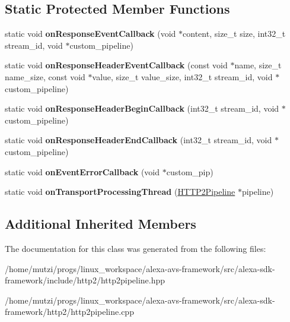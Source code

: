 \subsection*{Static Protected Member Functions}
\begin{DoxyCompactItemize}
\item 
\mbox{\label{classhttp2_1_1HTTP2Pipeline_abb2865cd0061831b365e250d414cb088}} 
static void {\bfseries on\+Response\+Event\+Callback} (void $\ast$content, size\+\_\+t size, int32\+\_\+t stream\+\_\+id, void $\ast$custom\+\_\+pipeline)
\item 
\mbox{\label{classhttp2_1_1HTTP2Pipeline_ac4048cb93d46d574e7e3c05435a49a5d}} 
static void {\bfseries on\+Response\+Header\+Event\+Callback} (const void $\ast$name, size\+\_\+t name\+\_\+size, const void $\ast$value, size\+\_\+t value\+\_\+size, int32\+\_\+t stream\+\_\+id, void $\ast$custom\+\_\+pipeline)
\item 
\mbox{\label{classhttp2_1_1HTTP2Pipeline_a31f18c22866f1df8892191bf37b0b392}} 
static void {\bfseries on\+Response\+Header\+Begin\+Callback} (int32\+\_\+t stream\+\_\+id, void $\ast$custom\+\_\+pipeline)
\item 
\mbox{\label{classhttp2_1_1HTTP2Pipeline_a1336a2961bd2c3329c18b93350d17409}} 
static void {\bfseries on\+Response\+Header\+End\+Callback} (int32\+\_\+t stream\+\_\+id, void $\ast$custom\+\_\+pipeline)
\item 
\mbox{\label{classhttp2_1_1HTTP2Pipeline_a5aee406489df0d228e7804cc63974ccf}} 
static void {\bfseries on\+Event\+Error\+Callback} (void $\ast$custom\+\_\+pip)
\item 
\mbox{\label{classhttp2_1_1HTTP2Pipeline_a3ca13a4c185ba3a3643d6c9274637fc9}} 
static void {\bfseries on\+Transport\+Processing\+Thread} (\hyperlink{classhttp2_1_1HTTP2Pipeline}{H\+T\+T\+P2\+Pipeline} $\ast$pipeline)
\end{DoxyCompactItemize}
\subsection*{Additional Inherited Members}


The documentation for this class was generated from the following files\+:\begin{DoxyCompactItemize}
\item 
/home/mutzi/progs/linux\+\_\+workspace/alexa-\/avs-\/framework/src/alexa-\/sdk-\/framework/include/http2/http2pipeline.\+hpp\item 
/home/mutzi/progs/linux\+\_\+workspace/alexa-\/avs-\/framework/src/alexa-\/sdk-\/framework/http2/http2pipeline.\+cpp\end{DoxyCompactItemize}
